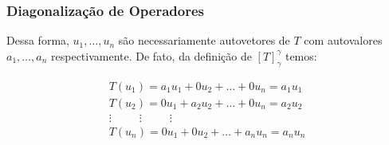 \documentclass[hyperref={pdfpagelabels=false}]{beamer}
\begin{document}
\begin{frame}
\frametitle{Diagonalização de Operadores}

Dessa forma, $u_1, \dots, u_n$ são necessariamente autovetores de $T$ com autovalores $a_1, \dots, a_n$ respectivamente. De fato, da definição de $[T]_{\gamma}^{\gamma}$ temos:

\begin{eqnarray*}
	T(u_1) = a_1 u_1 + 0u_2 + \dots + 0u_n = a_1 u_1\\
	T(u_2) = 0u_1 + a_2 u_2 + \dots + 0u_n = a_2 u_2\\
	\vdots \hspace{30pt} \vdots \hspace{30pt} \vdots \hspace{40pt} \\
	T(u_n) = 0u_1 + 0u_2 + \dots + a_n u_n = a_n u_n\\
\end{eqnarray*}


\end{frame}
\end{document}
